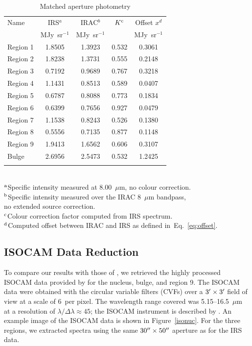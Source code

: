 \documentclass[useAMS,usenatbib,a4paper]{mn2e}
\begin{document}
\begin{table}
 \centering
 \begin{minipage}{100mm}
\caption{Matched aperture photometry}
  \begin{tabular}{lcccc}
  \hline{Name}&{IRS$^{a}$}&{IRAC$^{b}$}&{$K^{\rm c}$}&{Offset $x^d$} \\ 
{} & { MJy~sr$^{-1}$} & { MJy~sr$^{-1}$} & &  MJy~sr$^{-1}$
   \\
 \hline
 Region 1 & 1.8505 & 1.3923 & 0.532 & 0.3061
 \\ Region 2  & 1.8238 & 1.3731 & 0.555 & 0.2148
 \\ Region 3 & 0.7192 & 0.9689 & 0.767 & 0.3218
 \\ Region 4 & 1.1431 & 0.8513 & 0.589 & 0.0407
 \\  Region 5 & 0.6787 & 0.8088 & 0.773 & 0.1834
 \\  Region 6  & 0.6399 & 0.7656 & 0.927 & 0.0479
 \\  Region 7  & 1.1538 & 0.8243 & 0.526 & 0.1380
 \\ Region 8 & 0.5556 & 0.7135 & 0.877 & 0.1148
 \\  Region 9 & 1.9413 & 1.6562 & 0.606 & 0.3107 
 \\ Bulge & 2.6956 & 2.5473 & 0.532 & 1.2425\\
\hline
 \label{colourK}
\end{tabular}\\
 {$^{\rm a}$Specific intensity measured at 8.00~$\mu$m, no colour correction.\\
 $^{\rm b}$Specific intensity measured over the IRAC 8~$\mu$m bandpass,\\ no extended source correction.\\
$^{\rm c}$Colour correction factor computed from IRS spectrum.\\
 $^{\rm d}$Computed offset between IRAC and IRS as defined in~Eq.~\ref{eq:offset}. }
\end{minipage}
\end{table}

	


\subsection{ISOCAM Data Reduction}
\label{sect:iso_data}

To compare our results with those of  \citet{1998Cesarsky}, we retrieved the highly processed ISOCAM data provided by \citet{Boulanger_F_2005}  
for the nucleus, bulge, and region 9. 
The ISOCAM data were obtained with the circular variable filters (CVFs) over a $3\hbox{$^\prime$} \times 3\hbox{$^\prime$}$ field of view at a scale of 6\arcsec\ per pixel. 
The wavelength range covered was 5.15--16.5~$\mu$m at a resolution of $\lambda/\Delta \lambda \approx 45$; the ISOCAM instrument is described by \citet{cesarsky1996}.
An example image of the ISOCAM data is shown in Figure~\ref{isonuc}.  For the three regions, we extracted spectra using the same 
$30\hbox{$^{\prime\prime}$}\times50\hbox{$^{\prime\prime}$}$ aperture as for the IRS data. 
\end{document}
